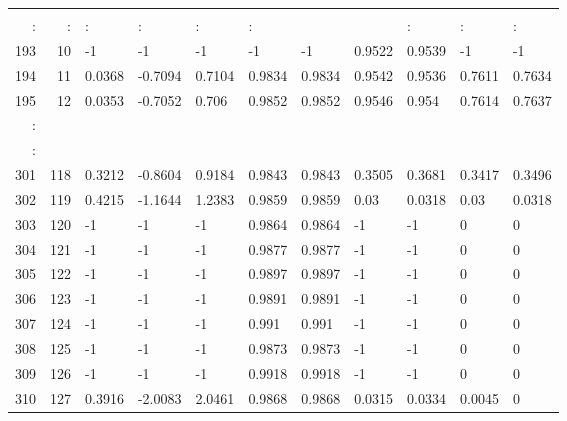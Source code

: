 \begin{table}[p]
{\begin{minipage}{\textheight}
\begin{tabular}{rr|lll|ll|llll}
 \hline &     			&        			&        			&       					&       	&       		&       	&       		&       			&       			\\
 :      & :   			& :      			& :      			& :     					& :     	&       		&       	& :     		& :     			& :     			\\
 193    & 10  			& -1     			& -1     			& -1    					& -1    	& -1    		& 0.9522	& 0.9539		& -1    			& -1    			\\
 194    & 11  			& 0.0368 			& -0.7094			& 0.7104					& 0.9834	& 0.9834		& 0.9542	& 0.9536		& 0.7611			& 0.7634			\\
 195    & 12  			& 0.0353 			& -0.7052			& 0.706 					& 0.9852	& 0.9852		& 0.9546	& 0.954 		& 0.7614			& 0.7637			\\
 :      &     			&        			&        			&       					&       	&       		&       	&       		&       			&       			\\
 \hline
 :      &     			&        			&        			&       					&       	&       		&       	&       		&       			&       			\\
 301    & 118 			& 0.3212 			& -0.8604			& 0.9184					& 0.9843	& 0.9843		& 0.3505	& 0.3681		& 0.3417			& 0.3496			\\
 302    & 119 			& 0.4215 			& -1.1644			& 1.2383					& 0.9859	& 0.9859		& 0.03  	& 0.0318		& 0.03  			& 0.0318			\\
 303    & 120 			& -1     			& -1     			& -1    					& 0.9864	& 0.9864		& -1    	& -1    		& 0     			& 0     			\\
 304    & 121 			& -1     			& -1     			& -1    					& 0.9877	& 0.9877		& -1    	& -1    		& 0     			& 0     			\\
 305    & 122 			& -1     			& -1     			& -1    					& 0.9897	& 0.9897		& -1    	& -1    		& 0     			& 0     			\\
 306    & 123 			& -1     			& -1     			& -1    					& 0.9891	& 0.9891		& -1    	& -1    		& 0     			& 0     			\\
 307    & 124 			& -1     			& -1     			& -1    					& 0.991 	& 0.991 		& -1    	& -1    		& 0     			& 0     			\\
 308    & 125 			& -1     			& -1     			& -1    					& 0.9873	& 0.9873		& -1    	& -1    		& 0     			& 0     			\\
 309    & 126 			& -1     			& -1     			& -1    					& 0.9918	& 0.9918		& -1    	& -1    		& 0     			& 0     			\\
 310    & 127 			& 0.3916 			& -2.0083			& 2.0461					& 0.9868	& 0.9868		& 0.0315	& 0.0334		& 0.0045			& 0     			\\

\end{tabular}
\end{minipage}}
\end{table}
